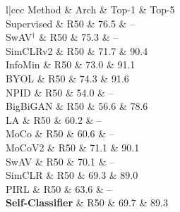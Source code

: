\begin{code}
    \begin{itabular}{l|ccc}
    \toprule
    Method & Arch & Top-1 & Top-5 \\
    \midrule
    Supervised & R50 & 76.5 & -- \\
    \midrule
    SwAV$^\dagger$ & R50 & 75.3 & -- \\
    \midrule
    SimCLRv2 & R50 & 71.7 & 90.4 \\
    InfoMin & R50 & 73.0 & 91.1 \\
    BYOL & R50 & 74.3 & 91.6 \\
    NPID & R50 & 54.0 & -- \\
    BigBiGAN & R50 & 56.6 & 78.6 \\
    LA & R50 & 60.2 & -- \\
    MoCo & R50 & 60.6 & -- \\
    MoCoV2 & R50 & 71.1 & 90.1 \\
    SwAV & R50 & 70.1 & -- \\
    SimCLR & R50 & 69.3 & 89.0 \\
    PIRL & R50 & 63.6 & -- \\
    \midrule
    \textbf{Self-Classifier}  & R50 & 69.7 & 89.3 \\
    \bottomrule
    \end{itabular}
\end{code}

\newpage







\taskseven

\begin{code}
\imagesizeguidesofdoctwo
\end{code}

\newpage






